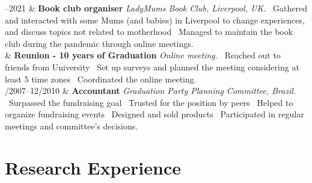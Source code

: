 \documentclass[11pt, a4paper]{article}
\newcommand{\Duration}[2]{\fontsize{10pt}{0}\selectfont #1--#2}
\newcommand{\Year}[1]{\fontsize{10pt}{0}\selectfont #1}
\begin{document}
\begin{EntriesTable}
	\Duration{2020}{2021}  &
	\textbf{Book club organiser}
	\newline
	\textit{ LadyMums Book Club, Liverpool, UK.}
	\newline
	\textbullet \ Gathered and interacted with some Mums (and babies) in Liverpool to change
	experiences, and discuss topics not related to motherhood
	\textbullet \ Managed to maintain the book club during the pandemic through
	online meetings.
	\\
	\Year{2020}  &
	\textbf{Reunion - 10 years of Graduation}
	\newline
	\textit{ Online meeting.}
	\newline
	\textbullet \ Reached out to friends from University
	\textbullet \ Set up surveys and planned the meeting considering at least 5
	time zones
	\textbullet \ Coordinated the online meeting.
	\\
	\Duration{04/2007}{12/2010}  &
	\textbf{Accountant}
	\newline
	\textit{ Graduation Party Planning Committee, Brazil.}
	\newline
	\textbullet \ Surpassed the fundraising goal
	\textbullet \ Trusted for the position by peers
	\textbullet \ Helped to organize fundraising events
	\textbullet \ Designed and sold products
	\textbullet \ Participated in regular meetings and
	committee's decisions.

\end{EntriesTable}


\section*{Research Experience}
\end{document}
